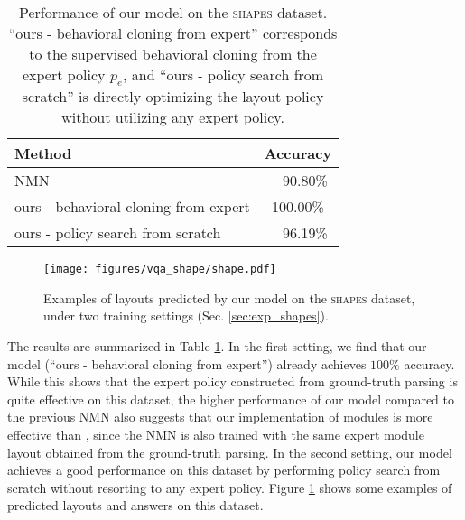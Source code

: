 \documentclass[10pt,twocolumn,letterpaper]{article}
\newcommand{\shapes}{\textsc{shapes}\xspace}
\begin{document}
\begin{table}[t]
\centering
\begin{tabular}{lc}
\toprule
Method & Accuracy \\
\hline
NMN \cite{andreas16neural} & ~~90.80\% \\
ours - behavioral cloning from expert & 100.00\% \\
ours - policy search from scratch & ~~96.19\% \\
\bottomrule
\end{tabular}\vspace{-0.2cm}
\caption{Performance of our model on the \shapes dataset. ``ours - behavioral cloning from expert'' corresponds to the supervised behavioral cloning from the expert policy $p_e$, and ``ours - policy search from scratch'' is directly optimizing the layout policy without utilizing any expert policy.}
\label{tab:results_shapes}
\vspace{-0.2cm}
\end{table}

\begin{figure}[t]
\centering
\texttt{[image: figures/vqa\_shape/shape.pdf]}\vspace{-0.2cm}
\caption{Examples of layouts predicted by our model on the \shapes dataset, under two training settings (Sec. \ref{sec:exp_shapes}).}
\label{fig:visualization_shapes}
\vspace{-0.5cm}
\end{figure}

The results are summarized in Table \ref{tab:results_shapes}. In the first setting, we find that our model (``ours - behavioral cloning from expert'') already achieves $100\%$ accuracy. While this shows that the expert policy constructed from ground-truth parsing is quite effective on this dataset, the higher performance of our model compared to the previous NMN \cite{andreas16neural} also suggests that our implementation of modules is more effective than \cite{andreas16neural}, since the NMN is also trained with the same expert module layout obtained from the ground-truth parsing. In the second setting, our model achieves a good performance on this dataset by performing policy search from scratch without resorting to any expert policy. Figure \ref{fig:visualization_shapes} shows some examples of predicted layouts and answers on this dataset.
\end{document}

